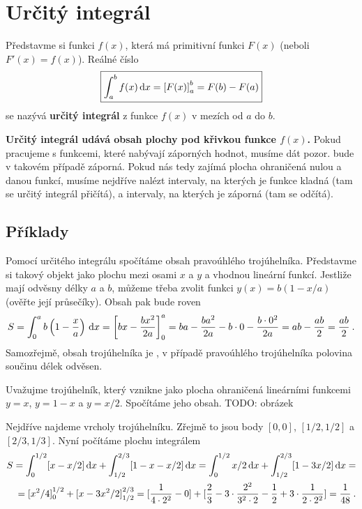 \section{Určitý integrál}

Představme si funkci $f(x)$, která má primitivní funkci $F(x)$ (neboli $F'(x)=f(x)$). Reálné číslo \begin{align}
    \boxed{
    \int_a^b f(x) \, \mathrm{d} x = \left[ F(x) \right]_a^b = F(b)-F(a)
    }
\end{align}
se nazývá \textbf{určitý integrál} z funkce $f(x)$ v mezích od $a$ do $b$. 

\textbf{Určitý integrál udává obsah plochy pod křivkou funkce $f(x)$.}
Pokud pracujeme s funkcemi, které nabývají záporných hodnot, musíme dát pozor.  bude v takovém případě záporná. Pokud nás tedy zajímá plocha ohraničená nulou a danou funkcí, musíme nejdříve nalézt intervaly, na kterých je funkce kladná (tam se určitý integrál přičítá), a intervaly, na kterých je záporná (tam se odčítá).

\subsection*{Příklady}

\begin{example}
    Pomocí určitého integrálu spočítáme obsah pravoúhlého trojúhelníka. Představme si takový objekt jako plochu mezi osami $x$ a $y$ a vhodnou lineární funkcí. Jestliže mají odvěsny délky $a$ a $b$, můžeme třeba zvolit funkci $y(x) = b(1-x/a)$ (ověřte její průsečíky). Obsah pak bude roven \begin{align}
        S = \int_0^a b\left(1-\frac{x}{a}\right) \, \mathrm{d} x = \left[ bx - \frac{bx^2}{2a} \right]_0^a =  ba - \frac{ba^2}{2a} - b \cdot 0 - \frac{b \cdot 0^2}{2a} = ab - \frac{ab}{2} = \frac{ab}{2} \:.
    \end{align}
    Samozřejmě, obsah trojúhelníka je , v případě pravoúhlého trojúhelníka polovina součinu délek odvěsen.
\end{example}

\begin{example}
    Uvažujme trojúhelník, který vznikne jako plocha ohraničená lineárními funkcemi $y=x$, $y=1-x$ a $y=x/2$. Spočítáme jeho obsah. TODO: obrázek

    Nejdříve najdeme vrcholy trojúhelníku. Zřejmě to jsou body $[0,0]$, $[1/2,1/2]$ a $[2/3,1/3]$.
    Nyní počítáme plochu integrálem \begin{align}
        S = \int_0^{1/2} [x-x/2] \, \mathrm{d} x + \int_{1/2}^{2/3} [1-x - x/2] \, \mathrm{d} x 
        =
        \int_0^{1/2} x/2 \, \mathrm{d} x + \int_{1/2}^{2/3} [1 - 3x/2] \, \mathrm{d} x 
        = \\ =
        [x^2/4]_0^{1/2} + [x-3x^2/2]_{1/2}^{2/3} 
        =
        [\frac{1}{4 \cdot 2^2} - 0 ] + [\frac{2}{3} - 3 \cdot \frac{2^2}{3^2 \cdot 2} - \frac{1}{2} + 3 \cdot \frac{1}{2 \cdot 2^2}] = \frac{1}{48} \:.
    \end{align}
\end{example}


